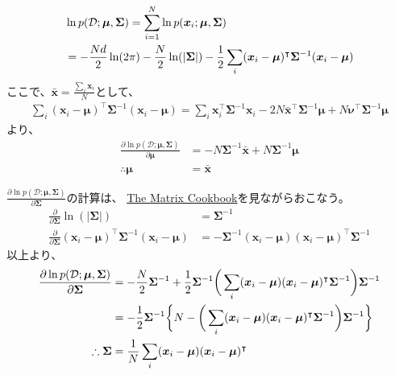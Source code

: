 \documentclass[aspectratio=169,unicode,dvipdfmx,14pt]{beamer}
\begin{document}
\begin{frame}
\FontMath
\begin{align}
& \ln p(\mathcal{D};\bm{\mu},\bm{\Sigma}) =\sum_{i=1}^N \ln p(\bm{x}_i;\bm{\mu},\bm{\Sigma}) \notag \\
& = - \frac{Nd}{2}\ln(2\pi) - \frac{N}{2}\ln(|\bm{\Sigma}|) - \frac{1}{2}\sum_i
(\bm{x}_i - \bm{\mu})^\intercal \bm{\Sigma}^{-1} (\bm{x}_i - \bm{\mu})
\end{align}
ここで、$\bar{\bm{x}}=\frac{\sum_i \bm{x}_i}{N}$として、
\begin{align}
\sum_i (\bm{x}_i - \bm{\mu})^\intercal \bm{\Sigma}^{-1} (\bm{x}_i - \bm{\mu})
= \sum_i \bm{x}_i^\intercal\bm{\Sigma}^{-1}\bm{x}_i 
- 2N\bar{\bm{x}}^\intercal\bm{\Sigma}^{-1}\bm{\mu}
+ N\bm{\nu}^\intercal\bm{\Sigma}^{-1}\bm{\mu}
\end{align}
より、
\begin{align}
\frac{\partial \ln p(\mathcal{D};\bm{\mu},\bm{\Sigma})}{\partial \bm{\mu}}
& = - N \bm{\Sigma}^{-1} \bar{\bm{x}} + N \bm{\Sigma}^{-1}\bm{\mu} \\
\therefore \bm{\mu} & = \bar{\bm{x}}
\end{align}
\end{frame}

\begin{frame}
\FontMath
$\frac{\partial \ln p(\mathcal{D};\bm{\mu},\bm{\Sigma})}{\partial \bm{\Sigma}}$の計算は、
\href{https://www.ics.uci.edu/~welling/teaching/KernelsICS273B/MatrixCookBook.pdf}{The Matrix Cookbook}を見ながらおこなう。
\begin{align}
\frac{\partial}{\partial \bm{\Sigma}}\ln(|\bm{\Sigma}|) & = \bm{\Sigma}^{-1} \\
\frac{\partial}{\partial \bm{\Sigma}}
(\bm{x}_i - \bm{\mu})^\intercal \bm{\Sigma}^{-1} (\bm{x}_i - \bm{\mu})
& = - \bm{\Sigma}^{-1} (\bm{x}_i - \bm{\mu}) (\bm{x}_i - \bm{\mu})^\intercal \bm{\Sigma}^{-1}
\end{align}
以上より、
\begin{align}
\frac{\partial \ln p(\mathcal{D};\bm{\mu},\bm{\Sigma})}{\partial \bm{\Sigma}}
&= - \frac{N}{2}\bm{\Sigma}^{-1}
+ \frac{1}{2} \bm{\Sigma}^{-1}  \bigg( \sum_i
(\bm{x}_i - \bm{\mu}) (\bm{x}_i - \bm{\mu})^\intercal \bm{\Sigma}^{-1} \bigg) \bm{\Sigma}^{-1} \notag \\
&= - \frac{1}{2}\bm{\Sigma}^{-1} \bigg\{
N - \bigg( \sum_i
(\bm{x}_i - \bm{\mu}) (\bm{x}_i - \bm{\mu})^\intercal \bm{\Sigma}^{-1} \bigg) \bm{\Sigma}^{-1} \bigg\} \\
\therefore
\bm{\Sigma} &= \frac{1}{N}\sum_i
(\bm{x}_i - \bm{\mu}) (\bm{x}_i - \bm{\mu})^\intercal 
\end{align}
\end{frame}
\end{document}
